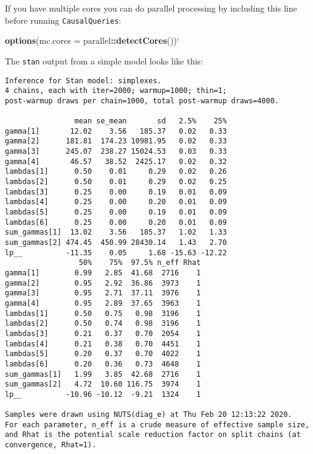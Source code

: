 \documentclass[
  12pt,
]{book}
\newenvironment{Shaded}{\begin{snugshade}}{\end{snugshade}}
\newcommand{\DataTypeTok}[1]{\textcolor[rgb]{0.13,0.29,0.53}{#1}}
\newcommand{\KeywordTok}[1]{\textcolor[rgb]{0.13,0.29,0.53}{\textbf{#1}}}
\newcommand{\NormalTok}[1]{#1}
\newcommand{\OperatorTok}[1]{\textcolor[rgb]{0.81,0.36,0.00}{\textbf{#1}}}
\newcommand{\StringTok}[1]{\textcolor[rgb]{0.31,0.60,0.02}{#1}}
\begin{document}
If you have multiple cores you can do parallel processing by including this line before running \texttt{CausalQueries}:

\begin{Shaded}
\begin{Highlighting}[]
\KeywordTok{options}\NormalTok{(}\DataTypeTok{mc.cores =}\NormalTok{ parallel}\OperatorTok{::}\KeywordTok{detectCores}\NormalTok{())}\StringTok{`}
\end{Highlighting}
\end{Shaded}

The \texttt{stan} output from a simple model looks like this:

\begin{verbatim}
Inference for Stan model: simplexes.
4 chains, each with iter=2000; warmup=1000; thin=1; 
post-warmup draws per chain=1000, total post-warmup draws=4000.

                mean se_mean       sd   2.5%    25%
gamma[1]       12.02    3.56   185.37   0.02   0.33
gamma[2]      181.81  174.23 10981.95   0.02   0.33
gamma[3]      245.07  238.27 15024.53   0.03   0.33
gamma[4]       46.57   38.52  2425.17   0.02   0.32
lambdas[1]      0.50    0.01     0.29   0.02   0.26
lambdas[2]      0.50    0.01     0.29   0.02   0.25
lambdas[3]      0.25    0.00     0.19   0.01   0.09
lambdas[4]      0.25    0.00     0.20   0.01   0.09
lambdas[5]      0.25    0.00     0.19   0.01   0.09
lambdas[6]      0.25    0.00     0.20   0.01   0.09
sum_gammas[1]  13.02    3.56   185.37   1.02   1.33
sum_gammas[2] 474.45  450.99 28430.14   1.43   2.70
lp__          -11.35    0.05     1.68 -15.63 -12.22
                 50%    75%  97.5% n_eff Rhat
gamma[1]        0.99   2.85  41.68  2716    1
gamma[2]        0.95   2.92  36.86  3973    1
gamma[3]        0.95   2.71  37.11  3976    1
gamma[4]        0.95   2.89  37.65  3963    1
lambdas[1]      0.50   0.75   0.98  3196    1
lambdas[2]      0.50   0.74   0.98  3196    1
lambdas[3]      0.21   0.37   0.70  2054    1
lambdas[4]      0.21   0.38   0.70  4451    1
lambdas[5]      0.20   0.37   0.70  4022    1
lambdas[6]      0.20   0.36   0.73  4648    1
sum_gammas[1]   1.99   3.85  42.68  2716    1
sum_gammas[2]   4.72  10.60 116.75  3974    1
lp__          -10.96 -10.12  -9.21  1324    1

Samples were drawn using NUTS(diag_e) at Thu Feb 20 12:13:22 2020.
For each parameter, n_eff is a crude measure of effective sample size,
and Rhat is the potential scale reduction factor on split chains (at 
convergence, Rhat=1).
\end{verbatim}
\end{document}
